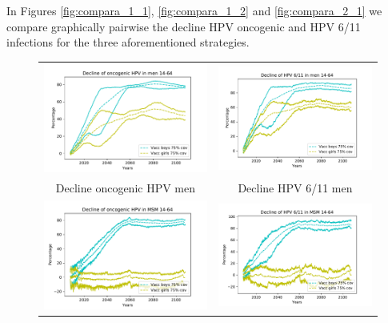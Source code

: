 In Figures \ref{fig:compara_1_1}, \ref{fig:compara_1_2} and \ref{fig:compara_2_1} we compare graphically pairwise the decline HPV oncogenic and HPV 6/11 infections for the three aforementioned strategies.

\begin{figure}[!]
	\centering
	\begin{tabular}{cc}
		\includegraphics[width=0.5\linewidth]{IMGs/10.-Coste_efectividad/solo_hom_y_solo_muj/onco_hom.pdf}	& 
		\includegraphics[width=0.5\linewidth]{IMGs/10.-Coste_efectividad/solo_hom_y_solo_muj/verr_hom.pdf}  \\ 
		Decline oncogenic HPV men	& Decline HPV 6/11 men \\ 
		\includegraphics[width=0.5\linewidth]{IMGs/10.-Coste_efectividad/solo_hom_y_solo_muj/onco_MSM.pdf}	& 
		\includegraphics[width=0.5\linewidth]{IMGs/10.-Coste_efectividad/solo_hom_y_solo_muj/verr_MSM.pdf}  \\ 

\end{tabular}
\end{figure}
